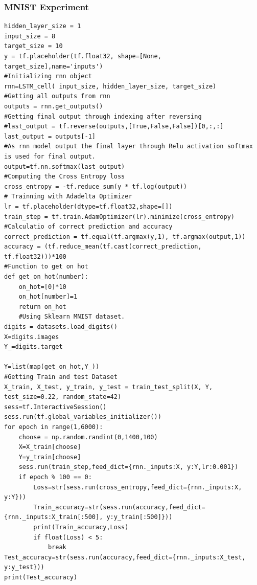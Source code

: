 \documentclass[12pt, letterpaper]{article}
\begin{document}
\subsubsection{MNIST Experiment}
\begin{verbatim}
hidden_layer_size = 1
input_size = 8
target_size = 10
y = tf.placeholder(tf.float32, shape=[None, target_size],name='inputs')
#Initializing rnn object
rnn=LSTM_cell( input_size, hidden_layer_size, target_size)
#Getting all outputs from rnn
outputs = rnn.get_outputs()
#Getting final output through indexing after reversing
#last_output = tf.reverse(outputs,[True,False,False])[0,:,:]
last_output = outputs[-1]
#As rnn model output the final layer through Relu activation softmax is used for final output.
output=tf.nn.softmax(last_output)
#Computing the Cross Entropy loss 
cross_entropy = -tf.reduce_sum(y * tf.log(output))
# Trainning with Adadelta Optimizer
lr = tf.placeholder(dtype=tf.float32,shape=[])
train_step = tf.train.AdamOptimizer(lr).minimize(cross_entropy)
#Calculatio of correct prediction and accuracy
correct_prediction = tf.equal(tf.argmax(y,1), tf.argmax(output,1))
accuracy = (tf.reduce_mean(tf.cast(correct_prediction, tf.float32)))*100
#Function to get on hot
def get_on_hot(number):
    on_hot=[0]*10
    on_hot[number]=1
    return on_hot
    #Using Sklearn MNIST dataset.
digits = datasets.load_digits()
X=digits.images
Y_=digits.target

Y=list(map(get_on_hot,Y_))
#Getting Train and test Dataset
X_train, X_test, y_train, y_test = train_test_split(X, Y, test_size=0.22, random_state=42)
sess=tf.InteractiveSession()
sess.run(tf.global_variables_initializer())
for epoch in range(1,6000):
    choose = np.random.randint(0,1400,100)
    X=X_train[choose]
    Y=y_train[choose]
    sess.run(train_step,feed_dict={rnn._inputs:X, y:Y,lr:0.001})
    if epoch % 100 == 0:
        Loss=str(sess.run(cross_entropy,feed_dict={rnn._inputs:X, y:Y}))
        Train_accuracy=str(sess.run(accuracy,feed_dict={rnn._inputs:X_train[:500], y:y_train[:500]}))
        print(Train_accuracy,Loss)
        if float(Loss) < 5:
            break
Test_accuracy=str(sess.run(accuracy,feed_dict={rnn._inputs:X_test, y:y_test}))
print(Test_accuracy)

\end{verbatim}
\end{document}
